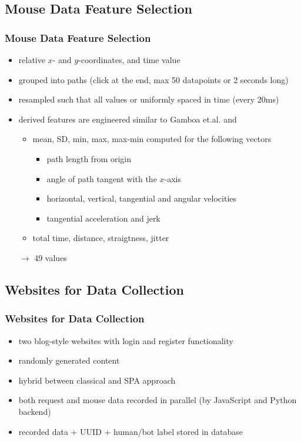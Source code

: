 \documentclass[t,aspectratio=169,table]{beamer}
\begin{document}
\subsection{Mouse Data Feature Selection}
\begin{frame}
\frametitle{Mouse Data Feature Selection}

\begin{itemize}
    \item relative $x$- and $y$-coordinates, and time value
    \item grouped into paths (click at the end, max 50 datapoints or 2 seconds long)
    \item resampled such that all values or uniformly spaced in time (every 20ms)
    \item derived features are engineered similar to Gamboa et.al.\cite{GAMBOA2004} and \cite{https://doi.org/10.1049/iet-bmt.2018.5126}
    \begin{itemize}
        \item mean, SD, min, max, max-min computed for the following vectors
        \begin{itemize}
            \item path length from origin
            \item angle of path tangent with the $x$-axis
            \item horizontal, vertical, tangential and angular velocities
            \item tangential acceleration and jerk
        \end{itemize}
        \item total time, distance, straigtness, jitter \\
    \end{itemize}
    $\rightarrow$ 49 values
\end{itemize}

\end{frame}

\subsection{Websites for Data Collection}
\begin{frame}
\frametitle{Websites for Data Collection}

\begin{itemize}
    \item two blog-style websites with login and register functionality
    \item randomly generated content
    \item hybrid between classical and SPA approach
    \item both request and mouse data recorded in parallel (by JavaScript and Python backend)
    \item recorded data + UUID + human/bot label stored in database
\end{itemize}

\end{frame}
\end{document}

